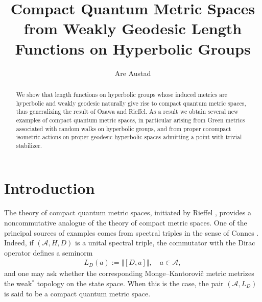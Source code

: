 \documentclass[12pt,a4paper,oneside,final,reqno]{amsart}
\title[CQMS from length functions on hyperbolic groups]{Compact Quantum Metric Spaces from Weakly Geodesic Length Functions on Hyperbolic Groups}
\author[1]{Are Austad}
\theoremstyle{plain}
\theoremstyle{definition}
\begin{document}
\maketitle

\begin{abstract}
    We show that length functions on hyperbolic groups whose induced metrics are hyperbolic and weakly geodesic naturally give rise to compact quantum metric spaces, thus generalizing the result of Ozawa and Rieffel. As a result we obtain several new examples of compact quantum metric spaces, in particular arising from Green metrics associated with random walks on hyperbolic groups, and from proper cocompact isometric  actions on proper geodesic hyperbolic spaces admitting a point with trivial stabilizer. 
\end{abstract}




\section{Introduction}\label{sec:introduction}
%
The theory of compact quantum metric spaces, initiated by Rieffel \cite{RieffelMetricsOnStateSpaces1999, RieffelCQMS04, Rieffel2004qGH, Rieffel2004MatrixAlgs, RieffelMartricialBridges2016}, provides a noncommutative analogue of the theory of compact metric spaces. One of the principal sources of examples comes from spectral triples in the sense of Connes \cite{Connes1989, ConnesNCGBook}. Indeed, if $(\mathcal{A},H,D)$ is a unital spectral triple, the commutator with the Dirac operator defines a seminorm
\begin{align*}
    L_D(a):=\Vert [D,a]\Vert ,\quad a\in\mathcal A,
\end{align*}
and one may ask whether the corresponding Monge--Kantorovič metric metrizes the weak$^*$ topology on the state space. When this is the case, the pair $(\mathcal{A},L_D)$ is said to be a compact quantum metric space.
\end{document}
